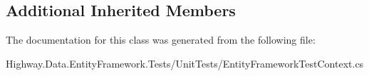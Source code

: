 \subsection*{Additional Inherited Members}


The documentation for this class was generated from the following file\-:\begin{DoxyCompactItemize}
\item 
Highway.\-Data.\-Entity\-Framework.\-Tests/\-Unit\-Tests/Entity\-Framework\-Test\-Context.\-cs\end{DoxyCompactItemize}

